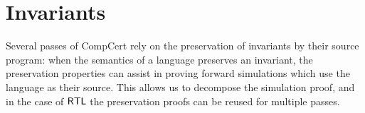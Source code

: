 \documentclass[sigplan,screen]{acmart}
\newenvironment{optional}{}{}
\begin{document}
\begin{optional}
%
%
%

\section{Invariants} \label{sec:inv} %


Several passes of CompCert
rely on the preservation of invariants
by their source program:
when the semantics of a language preserves an invariant,
the preservation properties can assist
in proving forward simulations
which use the language as their source.
This allows us to decompose the simulation proof,
and in the case of $ \mathsf{RTL} $
the preservation proofs can be reused for multiple passes.


\end{optional}
\end{document}
